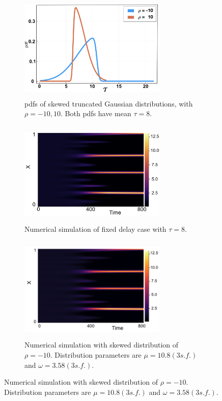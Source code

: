 \begin{figure}[H]
    \centering
    \begin{subfigure}[t]{0.45\textwidth}
        \centering
        \includegraphics[width=7cm,height=5cm]{distskew8.png}
        \caption{pdfs of skewed truncated Gaussian distributions, with $\rho=-10,10$. Both pdfs have mean $\tau=8$.}
        \label{}
    \end{subfigure}
    \hfill
    \begin{subfigure}[t]{0.45\textwidth}
        \centering
        \includegraphics[width=7cm,height=5cm]{fixt8.png}
        \caption{Numerical simulation of fixed delay case with $\tau=8$.}
        \label{}
    \end{subfigure}
    \hfill
    \begin{subfigure}[t]{0.45\textwidth}
        \centering
        \includegraphics[width=7cm,height=5cm]{skewt8m10.png}
        \caption{Numerical simulation with skewed distribution of $\rho=-10$. Distribution parameters are $\mu=10.8(3 s.f.)$ and $\omega=3.58(3 s.f.)$.}

\end{subfigure}
\end{figure}
